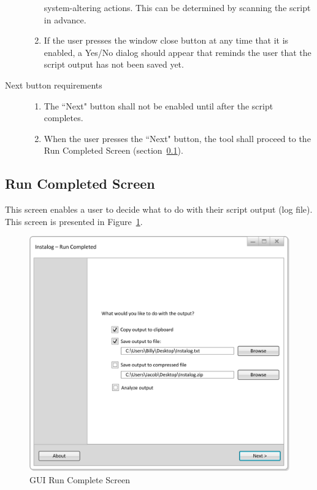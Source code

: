 \begin{description}
\begin{enumerate}
  system-altering actions.  This can be determined by scanning the script in
  advance.
  \item If the user presses the window close button at any time that it is
  enabled, a Yes/No dialog should appear that reminds the user that the script
  output has not been saved yet.
\end{enumerate}
\item[Next button requirements] \hfill 
\begin{enumerate}
  \item The ``Next" button shall not be enabled until after the script 
  completes.
  \item When the user presses the ``Next" button, the tool shall proceed to the
  Run Completed Screen (section~\ref{sec:run_completed_screen}).
\end{enumerate}
\end{description}

\subsection{Run Completed Screen} \label{sec:run_completed_screen}
This screen enables a user to decide what to do with their script output (log
file).  This screen is presented in Figure~\ref{fig:gui_run_complete}.

\begin{figure}[!ht]
  	\centering
	\includegraphics{figures/gui/Run_Completed.png}
  	\caption{GUI Run Complete Screen}
  	\label{fig:gui_run_complete}
\end{figure}


